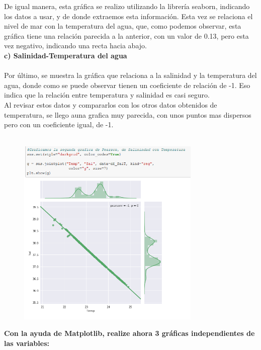 \documentclass[12pt]{article}
\begin{document}
De igual manera, esta gráfica se realizo utilizando la librería seaborn, indicando los datos a usar, y de donde extraemos esta información. Esta vez se relaciona el nivel de mar con la temperatura del agua, que, como podemos observar, esta gráfica tiene una relación parecida a la anterior, con un valor de 0.13, pero esta vez negativo, indicando una recta hacia abajo. \\

\noindent\textbf {c) Salinidad-Temperatura del agua} \\ \\
Por último, se muestra la gráfica que relaciona a la salinidad y la temperatura del agua, donde como se puede observar tienen un coeficiente de relación de -1. Eso indica que la relación entre temperatura y salinidad es casi seguro. \\

Al revisar estos datos y compararlos con los otros datos obtenidos de temperatura, se llego auna grafica muy parecida, con unos puntos mas dispersos pero con un coeficiente igual, de -1. \\ \\

\begin{figure}[h]
    \centering
\includegraphics[width=3.45in]{Pearson3.png}
\end{figure}

\noindent\textbf {Con la ayuda de Matplotlib, realize ahora 3 gráficas independientes de las variables: } \\
\end{document}
